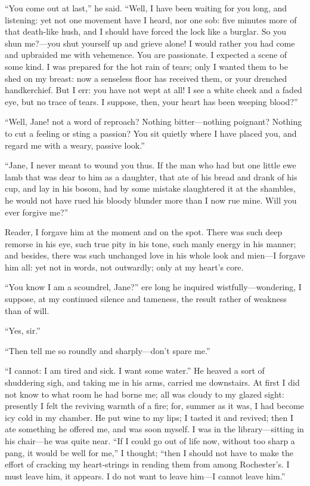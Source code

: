 \enquote{You come out at last,} he said. \enquote{Well, I have been
waiting for you long, and listening: yet not one movement have I heard,
nor one sob: five minutes more of that death-like hush, and I should
have forced the lock like a burglar. So you shun me?---you shut
yourself up and grieve alone! I would rather you had come and upbraided
me with vehemence. You are passionate. I expected a scene of some
kind. I was prepared for the hot rain of tears; only I wanted them to
be shed on my breast: now a senseless floor has received them, or your
drenched handkerchief. But I err: you have not wept at all! I see a
white cheek and a faded eye, but no trace of tears. I suppose, then,
your heart has been weeping blood?}

\enquote{Well, Jane! not a word of reproach? Nothing bitter---nothing
poignant? Nothing to cut a feeling or sting a passion? You sit quietly
where I have placed you, and regard me with a weary, passive look.}

\enquote{Jane, I never meant to wound you thus. If the man who had but
one little ewe lamb that was dear to him as a daughter, that ate of his
bread and drank of his cup, and lay in his bosom, had by some mistake
slaughtered it at the shambles, he would not have rued his bloody
blunder more than I now rue mine. Will you ever forgive me?}

Reader, I forgave him at the moment and on the spot. There was such
deep remorse in his eye, such true pity in his tone, such manly energy
in his manner; and besides, there was such unchanged love in his whole
look and mien---I forgave him all: yet not in words, not outwardly; only
at my heart's core.

\enquote{You know I am a scoundrel, Jane?} ere long he inquired
wistfully---wondering, I suppose, at my continued silence and tameness,
the result rather of weakness than of will.

\enquote{Yes, sir.}

\enquote{Then tell me so roundly and sharply---don't spare me.}

\enquote{I cannot: I am tired and sick. I want some water.} He heaved
a sort of shuddering sigh, and taking me in his arms, carried me
downstairs. At first I did not know to what room he had borne me; all
was cloudy to my glazed sight: presently I felt the reviving warmth of a
fire; for, summer as it was, I had become icy cold in my chamber. He
put wine to my lips; I tasted it and revived; then I ate something he
offered me, and was soon myself. I was in the library---sitting in his
chair---he was quite near. \enquote{If I could go out of life now,
without too sharp a pang, it would be well for me,} I thought;
\enquote{then I should not have to make the effort of cracking my
heart-strings in rending them from among \Mr{} Rochester's. I must leave
him, it appears. I do not want to leave him---I cannot leave him.}


